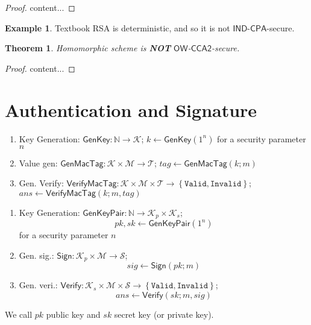 \documentclass[12pt,openany]{book}
\newtheorem{theorem}{Theorem}[chapter]
\theoremstyle{definition}
\newtheorem{example}{Example}[chapter]
\newcommand{\set}[1]{\left\{#1\right\}}
\newcommand{\N}{\mathbb{N}}
\newcommand{\OW}{\mathsf{OW}}
\newcommand{\IND}{\mathsf{IND}}
\newcommand{\CPA}{\mathsf{CPA}}
\newcommand{\CCATwo}{\mathsf{CCA2}}
\newcommand{\GenKey}{\mathsf{GenKey}}
\newcommand{\GenKeyPair}{\mathsf{GenKeyPair}}
\newcommand{\GenMacTag}{\mathsf{GenMacTag}}
\newcommand{\VerifyMacTag}{\mathsf{VerifyMacTag}}
\newcommand{\Sign}{\mathsf{Sign}}
\newcommand{\Verify}{\mathsf{Verify}}
\newcommand{\vaild}{\texttt{Valid}}
\newcommand{\invaild}{\texttt{Invalid}}
\begin{document}
	\begin{proof}
		content...
	\end{proof}
	\vspace{4pt}
	\begin{example}
		{Textbook RSA} is deterministic, and so it is not $\IND$-$\CPA$-secure.
	\end{example}
	\vspace{8pt}
	\begin{tcolorbox}[colback=white,colframe=thmcolor,arc=5pt,title={\color{white}\bf }]
		\begin{theorem}
			Homomorphic scheme is \textbf{NOT} $\OW$-$\CCATwo$-secure.
		\end{theorem}
	\end{tcolorbox}
	\begin{proof}
		content...
	\end{proof}
	
	\newpage
	\section{Authentication and Signature}
	
	\begin{tcolorbox}[colback=white,colframe=defcolor,arc=5pt,title={\color{white}\bf Message Authentication Code (MAC)}]
		\begin{enumerate}[(1)]
			\item Key Generation: $\GenKey:\N\to\mathcal{K}$; $k\gets\GenKey(1^n)$ for a security parameter $n$
			\item Value gen: $\GenMacTag:\mathcal{K}\times\mathcal{M}\to\mathcal{T}$; $tag\gets\GenMacTag(k;m)$
			\item Gen. Verify: $\VerifyMacTag:\mathcal{K}\times\mathcal{M}\times\mathcal{T}\to\set{\vaild,\invaild}$; $ans\gets\VerifyMacTag(k;m,tag)$
		\end{enumerate}
	\end{tcolorbox}
	\vspace{8pt}
	\begin{tcolorbox}[colback=white,colframe=defcolor,arc=5pt,title={\color{white}\bf Signature}]
		\begin{enumerate}[(1)]
			\item Key Generation: $\GenKeyPair:\N\to\mathcal{K}_p\times\mathcal{K}_s$; \[
			pk,sk\gets\GenKeyPair(1^n)
			\] for a security parameter $n$
			\item Gen. sig.: $\Sign:\mathcal{K}_p\times\mathcal{M}\to\mathcal{S}$;
			$$sig\gets\Sign(pk;m)$$
			\item Gen. veri.: $\Verify:\mathcal{K}_s\times\mathcal{M}\times\mathcal{S}\to\set{\vaild,\invaild}$;
			$$ans\gets\Verify(sk;m,sig)$$
		\end{enumerate} We call $pk$ public key and $sk$ secret key (or private key).
	\end{tcolorbox}
	
\end{document}
